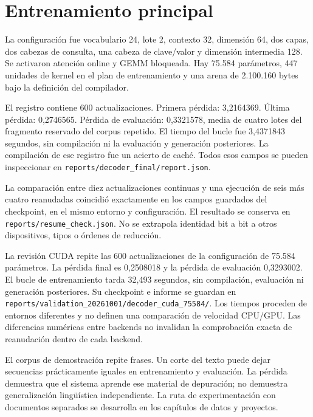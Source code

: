 \section{Entrenamiento principal}
La configuración fue vocabulario 24, lote 2, contexto 32, dimensión 64, dos capas, dos cabezas de consulta, una cabeza de clave/valor y dimensión intermedia 128. Se activaron atención online y GEMM bloqueada. Hay 75.584 parámetros, 447 unidades de kernel en el plan de entrenamiento y una arena de 2.100.160 bytes bajo la definición del compilador.

El registro contiene 600 actualizaciones. Primera pérdida: 3,2164369. Última pérdida: 0,2746565. Pérdida de evaluación: 0,3321578, media de cuatro lotes del fragmento reservado del corpus repetido. El tiempo del bucle fue 3,4371843 segundos, sin compilación ni la evaluación y generación posteriores. La compilación de ese registro fue un acierto de caché. Todos esos campos se pueden inspeccionar en \texttt{reports/decoder\_final/report.json}.

La comparación entre diez actualizaciones continuas y una ejecución de seis más cuatro reanudadas coincidió exactamente en los campos guardados del checkpoint, en el mismo entorno y configuración. El resultado se conserva en \texttt{reports/resume\_check.json}. No se extrapola identidad bit a bit a otros dispositivos, tipos o órdenes de reducción.

La revisión CUDA repite las 600 actualizaciones de la configuración de 75.584 parámetros. La pérdida final es 0,2508018 y la pérdida de evaluación 0,3293002. El bucle de entrenamiento tarda 32,493 segundos, sin compilación, evaluación ni generación posteriores. Su checkpoint e informe se guardan en \texttt{reports/validation\_20261001/decoder\_cuda\_75584/}. Los tiempos proceden de entornos diferentes y no definen una comparación de velocidad CPU/GPU. Las diferencias numéricas entre backends no invalidan la comprobación exacta de reanudación dentro de cada backend.

\begin{cuidado}
El corpus de demostración repite frases. Un corte del texto puede dejar secuencias prácticamente iguales en entrenamiento y evaluación. La pérdida demuestra que el sistema aprende ese material de depuración; no demuestra generalización lingüística independiente. La ruta de experimentación con documentos separados se desarrolla en los capítulos de datos y proyectos.
\end{cuidado}

